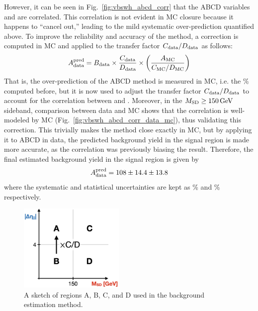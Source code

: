 However, it can be seen in Fig.~\ref{fig:vbswh_abcd_corr} that the ABCD variables \detajj and \MSD are correlated.
This correlation is not evident in MC closure because it happens to ``cancel out,'' leading to the mild systematic over-prediction quantified above. 
To improve the reliability and accuracy of the method, a correction is computed in MC and applied to the transfer factor $C_{\text{data}}/D_{\text{data}}$ as follows:
\begin{equation*}
    A_{\text{data}}^\text{pred} = B_{\text{data}}\times\frac{C_{\text{data}}}{D_{\text{data}}}\times\bigg(\frac{A_{\mathrm{MC}}}{C_{\mathrm{MC}}/D_{\mathrm{MC}}}\bigg)
\end{equation*}
That is, the over-prediction of the ABCD method is measured in MC, i.e. the \BkgEstTotalSystErr\% computed before, but it is now used to adjust the transfer factor $C_{\text{data}}/D_{\text{data}}$ to account for the correlation between \MSD and \detajj. 
Moreover, in the $M_{\mathrm{SD}} \geq 150\,\text{Ge\hspace{-.08em}V}$ sideband, comparison between data and MC shows that the correlation is well-modeled by MC (Fig.~\ref{fig:vbswh_abcd_corr_data_mc}), thus validating this correction. 
This trivially makes the method close exactly in MC, but by applying it to ABCD in data, the predicted background yield in the signal region is made more accurate, as the correlation was previously biasing the result.
Therefore, the final estimated background yield in the signal region is given by
\begin{equation*}
    A_{\text{data}}^{\text{pred}} = 108 \pm 14.4 \pm 13.8
\end{equation*}
where the systematic and statistical uncertainties are kept as \BkgEstTotalSystErr\% and \BkgEstStatErr\% respectively.

\begin{figure}[htb]
    \centering
    \includegraphics[width=0.45\textwidth]{fig/vbswh/abcd_cartoon.png}
    \caption{
        A sketch of regions A, B, C, and D used in the background estimation method.
    }
    \label{fig:vbswh_abcd_cartoon}
\end{figure}

